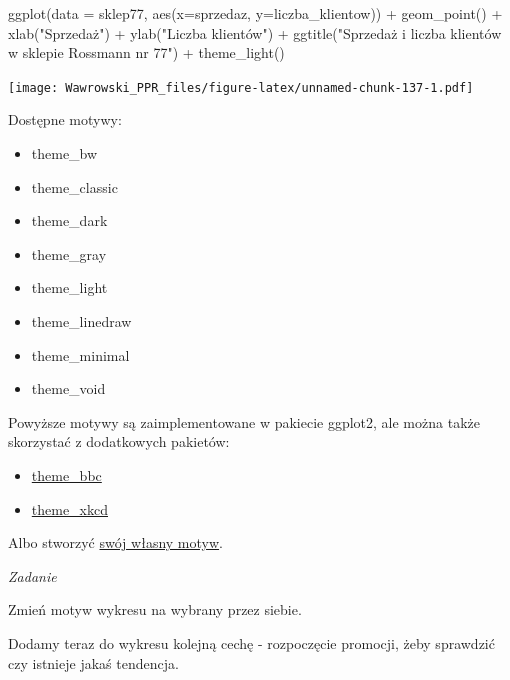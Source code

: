 \documentclass[
]{book}
\newenvironment{Shaded}{\begin{snugshade}}{\end{snugshade}}
\newcommand{\AttributeTok}[1]{\textcolor[rgb]{0.77,0.63,0.00}{#1}}
\newcommand{\FunctionTok}[1]{\textcolor[rgb]{0.00,0.00,0.00}{#1}}
\newcommand{\NormalTok}[1]{#1}
\newcommand{\SpecialCharTok}[1]{\textcolor[rgb]{0.00,0.00,0.00}{#1}}
\newcommand{\StringTok}[1]{\textcolor[rgb]{0.31,0.60,0.02}{#1}}
\providecommand{\tightlist}{%
  \setlength{\itemsep}{0pt}\setlength{\parskip}{0pt}}
\begin{document}
\begin{Shaded}
\begin{Highlighting}[]
\FunctionTok{ggplot}\NormalTok{(}\AttributeTok{data =}\NormalTok{ sklep77, }\FunctionTok{aes}\NormalTok{(}\AttributeTok{x=}\NormalTok{sprzedaz, }\AttributeTok{y=}\NormalTok{liczba\_klientow)) }\SpecialCharTok{+}
  \FunctionTok{geom\_point}\NormalTok{() }\SpecialCharTok{+}
  \FunctionTok{xlab}\NormalTok{(}\StringTok{"Sprzedaż"}\NormalTok{) }\SpecialCharTok{+}
  \FunctionTok{ylab}\NormalTok{(}\StringTok{"Liczba klientów"}\NormalTok{) }\SpecialCharTok{+}
  \FunctionTok{ggtitle}\NormalTok{(}\StringTok{"Sprzedaż i liczba klientów w sklepie Rossmann nr 77"}\NormalTok{) }\SpecialCharTok{+}
  \FunctionTok{theme\_light}\NormalTok{()}
\end{Highlighting}
\end{Shaded}

\texttt{[image: Wawrowski\_PPR\_files/figure-latex/unnamed-chunk-137-1.pdf]}

Dostępne motywy:

\begin{itemize}
\tightlist
\item
  theme\_bw
\item
  theme\_classic
\item
  theme\_dark
\item
  theme\_gray
\item
  theme\_light
\item
  theme\_linedraw
\item
  theme\_minimal
\item
  theme\_void
\end{itemize}

Powyższe motywy są zaimplementowane w pakiecie ggplot2, ale można także skorzystać z dodatkowych pakietów:

\begin{itemize}
\tightlist
\item
  \href{https://github.com/bbc/bbplot}{theme\_bbc}
\item
  \href{https://cran.r-project.org/web/packages/xkcd/}{theme\_xkcd}
\end{itemize}

Albo stworzyć \href{https://www.statworx.com/de/blog/custom-themes-in-ggplot2/}{swój własny motyw}.

\emph{Zadanie}

Zmień motyw wykresu na wybrany przez siebie.

Dodamy teraz do wykresu kolejną cechę - rozpoczęcie promocji, żeby sprawdzić czy istnieje jakaś tendencja.
\end{document}
